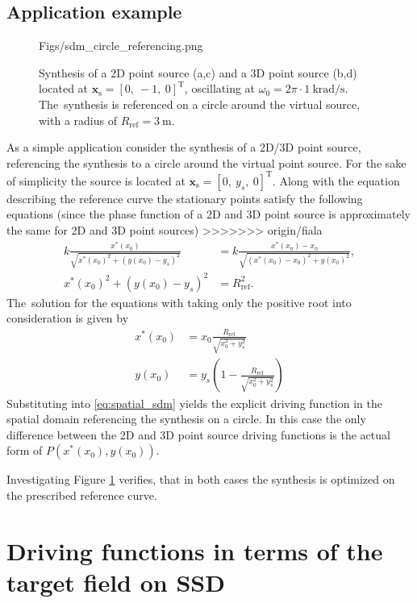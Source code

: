 \documentclass[12pt,a4paper]{article}
\newcommand{\vxs}{\mathbf{x}_{\mathrm{s}}}
\begin{document}
\subsection{Application example}
\begin{figure}
	\centering
	\begin{overpic}[width = .95\columnwidth ]{Figs/sdm_circle_referencing.png}
	\scriptsize
	\end{overpic}
	\caption{Synthesis of a 2D point source (a,c) and a 3D point source (b,d) located at $\vxs = [0,\ -1,\ 0]^\mathrm{T}$, oscillating at $\omega_0 = 2\pi \cdot 1 ~\mathrm{krad/s}$.
	The~synthesis is referenced on a circle around the virtual source, with a radius of $R_{\mathrm{ref}} = 3~\mathrm{m}$.}
	\label{fig:sdm_spatial_1}
\end{figure}
As a simple application consider the synthesis of a 2D/3D point source, referencing the synthesis to a circle around the virtual point source.
For the sake of simplicity the source is located at $\vxs = [0,\ y_s,\ 0]^{\mathrm{T}}$. Along with the equation describing the reference curve the stationary points satisfy the following equations (since the phase function of a 2D and 3D point source is approximately the same for 2D and 3D point sources)
>>>>>>> origin/fiala
\begin{align}
k \frac{x^*(x_0)}{\sqrt{x^*(x_0)^2 + (y(x_0)-y_s)^2}} &= k \frac{x^*(x_0)-x_0}{\sqrt{(x^*(x_0)-x_0)^2 + y(x_0)^2}}, \\
x^*(x_0)^2 + (y(x_0)-y_s)^2     &= R_{\mathrm{ref}}^2.
\end{align}
The~solution for the equations with taking only the positive root into consideration is given by
\begin{align}
x^*(x_0) &= x_0 \frac{ R_{\mathrm{ref}}}{\sqrt{x_0^2 + y_s^2}} \\
y(x_0) 	 &= y_s \left( 1 -  \frac{R_{\mathrm{ref}}}{\sqrt{x_0^2 + y_s^2}}\right)
\end{align}
Substituting into \eqref{eq:spatial_sdm} yields the explicit driving function in the spatial domain referencing the synthesis on a circle.
In this case the only difference between the 2D and 3D point source driving functions is the actual form of $P(x^*(x_0),y(x_0))$.

Investigating Figure \ref{fig:sdm_spatial_1} verifies, that in both cases the synthesis is optimized on the prescribed reference curve.

\newpage
\section{Driving functions in terms of the target field on SSD}
\end{document}
